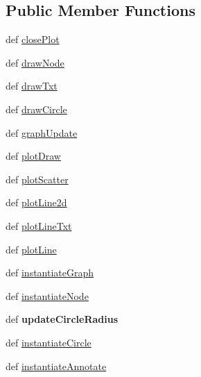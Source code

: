 \subsection*{Public Member Functions}
\begin{DoxyCompactItemize}
\item 
def \hyperlink{classmininet_1_1wifiPlot_1_1plot_a16e07a7c655bcf1704011a677e82e3b7}{close\-Plot}
\item 
def \hyperlink{classmininet_1_1wifiPlot_1_1plot_a95c9ae54e6cef33f10203d098358fac4}{draw\-Node}
\item 
def \hyperlink{classmininet_1_1wifiPlot_1_1plot_abdfdf0d24468b5cf95c48c654dc033c9}{draw\-Txt}
\item 
def \hyperlink{classmininet_1_1wifiPlot_1_1plot_ab15b99dd9089f2da38aa7d245d9ec93f}{draw\-Circle}
\item 
def \hyperlink{classmininet_1_1wifiPlot_1_1plot_ab5ec203809c86f599838a22ee7603d69}{graph\-Update}
\item 
def \hyperlink{classmininet_1_1wifiPlot_1_1plot_af288f91f175e6a7694153fe2ba610dab}{plot\-Draw}
\item 
def \hyperlink{classmininet_1_1wifiPlot_1_1plot_a02d84da948e4442329345e5ae4f3be25}{plot\-Scatter}
\item 
def \hyperlink{classmininet_1_1wifiPlot_1_1plot_ac481c27201492c944bd9626e6e794b60}{plot\-Line2d}
\item 
def \hyperlink{classmininet_1_1wifiPlot_1_1plot_a731bdfc39255d8a3fcd83728ae51d37d}{plot\-Line\-Txt}
\item 
def \hyperlink{classmininet_1_1wifiPlot_1_1plot_a52436c39966631f6038855adaeffff88}{plot\-Line}
\item 
def \hyperlink{classmininet_1_1wifiPlot_1_1plot_abf2babf19c2a94ddc21f4ade3a6edce8}{instantiate\-Graph}
\item 
def \hyperlink{classmininet_1_1wifiPlot_1_1plot_a91bcdaa91049db2ebf8ee02b92330021}{instantiate\-Node}
\item 
\hypertarget{classmininet_1_1wifiPlot_1_1plot_adad8a800d48b1720a3022598cf447760}{def {\bfseries update\-Circle\-Radius}}\label{classmininet_1_1wifiPlot_1_1plot_adad8a800d48b1720a3022598cf447760}

\item 
def \hyperlink{classmininet_1_1wifiPlot_1_1plot_ac962d93dca5cf6ef7fc71e38e2b22b2f}{instantiate\-Circle}
\item 
def \hyperlink{classmininet_1_1wifiPlot_1_1plot_a428302bd589ef359c6f3463495bf243e}{instantiate\-Annotate}
\end{DoxyCompactItemize}
